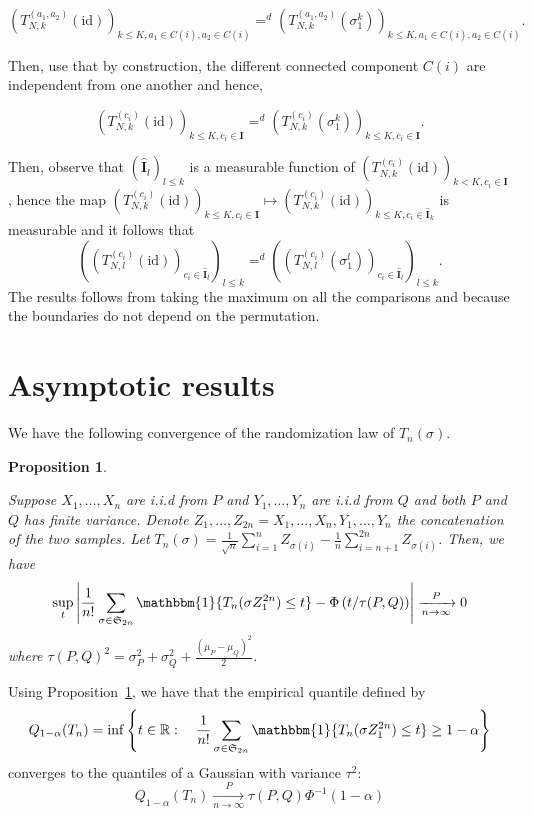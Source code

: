 \documentclass{article}
\theoremstyle{plain}
\newtheorem{Proposition}{Proposition}
\theoremstyle{remark}
\newcommand{\R}{\mathbb{R}}
\renewcommand{\S}{\mathfrak{S}}
\newcommand{\1}{\mathbbm{1}}
\newcommand{\id}{\mathrm{id}}
\newcommand{\todoT}[1]{\todo[inline,color=blue!30]{{\textbf{T:}~}#1}}
\numberwithin{equation}{section}
\begin{document}
$$(T_{N,k}^{(a_1,a_2)}(\id))_{ k\le K, a_1 \in C(i), a_2 \in C(i)}=^d(T_{N,k}^{(a_1,a_2)}(\sigma_1^k))_{ k\le K, a_1 \in C(i), a_2 \in C(i)}.$$

Then, use that by construction, the different connected component $C(i)$ are independent from one another and hence, 

$$(T_{N,k}^{(c_i)}(\id))_{ k\le K, c_i \in \textbf{I}}=^d(T_{N,k}^{(c_i)}(\sigma_1^k))_{ k\le K,  c_i \in \textbf{I}}.$$

Then, observe that $(\widehat{\textbf{I}}_l)_{l\le k}$ is a measurable function of $(T_{N,k}^{(c_i)}(\id))_{ k< K, c_i \in \textbf{I}}$, hence the map $(T_{N,k}^{(c_i)}(\id))_{ k\le K, c_i \in \textbf{I}} \mapsto (T_{N,k}^{(c_i)}(\id))_{ k\le K, c_i \in \widehat{\textbf{I}}_k}$ is measurable and it follows that 
$$((T_{N,l}^{(c_i)}(\id))_{ c_i \in \widehat{\textbf{I}}_l})_{l \le k}=^d((T_{N,l}^{(c_i)}(\sigma_1^l))_{ c_i \in \widehat{\textbf{I}}_l})_{l \le k}.$$
The results follows from taking the maximum on all the comparisons and because the boundaries do not depend on the permutation.
\section{Asymptotic results}
\todoT{Change notations}
We have the following convergence of the randomization law of $T_n(\sigma)$.
\begin{Proposition}\label{prop:asym_perm_test}

Suppose $X_1,\dots,X_n$ are i.i.d from $P$ and $Y_1,\dots,Y_n$ are i.i.d from $Q$ and both $P$ and $Q$ has finite variance. Denote $Z_1,\dots,Z_{2n}=X_1,\dots,X_n, Y_1,\dots,Y_n$ the concatenation of the two samples. Let $T_n(\sigma)=\frac{1}{\sqrt{n}}\sum_{i=1}^n Z_{\sigma(i)} -\frac{1}{n}\sum_{i=n+1}^{2n} Z_{\sigma(i)}$.
Then, we have
$$\sup_{t}\left|\frac{1}{n!}\sum_{\sigma \in \S_{2n}} \1\{T_n(\sigma Z_{1}^{2n}) \le t\}- \Phi\left(t/\tau(P,Q) \right)\right|\xrightarrow[n \to \infty]{P} 0$$
where $\tau(P,Q)^2=\sigma_P^2+\sigma_Q^2+\frac{(\mu_P- \mu_Q)^2}{2} $.
\end{Proposition}

Using Proposition~\ref{prop:asym_perm_test}, we have that the empirical quantile defined by
$$Q_{1-\alpha}(T_n) = \inf\left\{t \in \R:\quad \frac{1}{n!}\sum_{\sigma \in \S_{2n}} \1\{T_n(\sigma Z_{1}^{2n}) \le t\} \ge 1-\alpha\right\} $$
converges to the quantiles of a Gaussian with variance $\tau^2$:
$$Q_{1-\alpha}(T_n)\xrightarrow[n \to \infty]{P} \tau(P,Q)\Phi^{-1}(1-\alpha) $$
\end{document}
